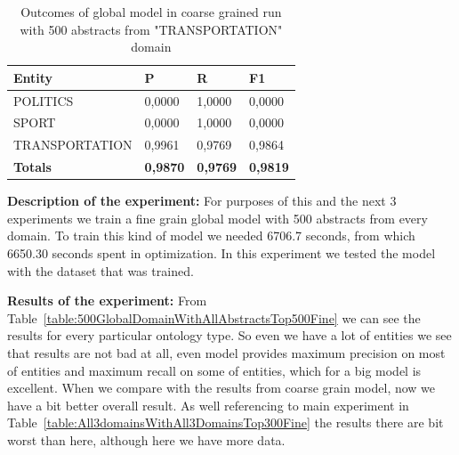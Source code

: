 \documentclass[thesis=M,english]{FITthesis}[2018/05/30]
\begin{document}
	\begin{table}[H]\centering
		\begin{tabular}{|l|l|l|l|}
			\hline {\textbf{Entity}} & {\textbf{P}} & {\textbf{R}} & {\textbf{F1}}\\\hline
				POLITICS & 0,0000 & 1,0000 & 0,0000\\
				SPORT & 0,0000 & 1,0000 & 0,0000\\
				TRANSPORTATION & 0,9961 & 0,9769 & 0,9864\\\hline
				\textbf{Totals} & \textbf{0,9870} & \textbf{0,9769} & \textbf{0,9819}\\\hline
		\end{tabular}
		\caption{Outcomes of global model in coarse grained run with 500 abstracts from "TRANSPORTATION" domain \label{table:500GlobalDomainWithTransportationTop500Coarse}}
	\end{table}	
		


	\textbf{Description of the experiment:} For purposes of this and the next 3 experiments we train a fine grain global model with 500 abstracts from every domain. To train this kind of model we needed 6706.7 seconds, from which 6650.30 seconds spent in optimization. In this experiment we tested the model with the dataset that was trained. 

	\textbf{Results of the experiment:} From Table~\ref{table:500GlobalDomainWithAllAbstractsTop500Fine} we can see the results for every particular ontology type. So even we have a lot of entities we see that results are not bad at all, even model provides maximum precision on most of entities and maximum recall on some of entities, which for a big model is excellent. When we compare with the results from coarse grain model, now we have a bit better overall result. As well referencing to main experiment in Table~\ref{table:All3domainsWithAll3DomainsTop300Fine} the results there are bit worst than here, although here we have more data.
\end{document}

